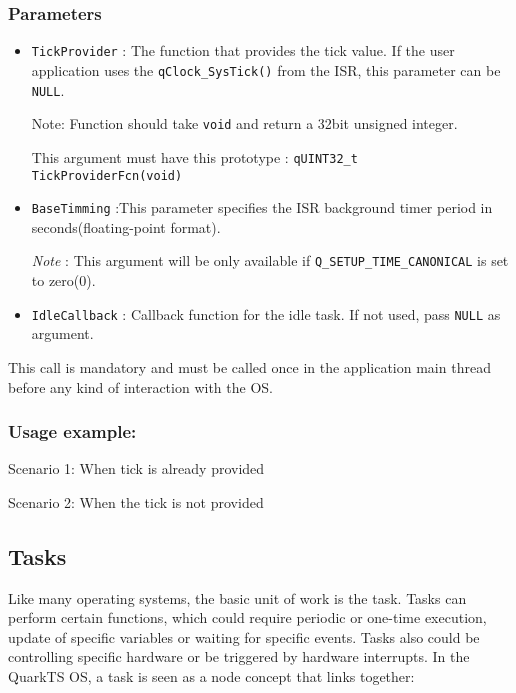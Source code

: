 \subsubsection*{Parameters}
\begin{itemize}
    \item \lstinline{TickProvider} : The function that provides the tick value. If the user application uses the \lstinline{qClock_SysTick()} from the ISR, this parameter can be \lstinline{NULL}. 
    
    Note: Function should take \lstinline{void} and return a 32bit unsigned integer.
    
    This argument must have this prototype : \lstinline{qUINT32_t TickProviderFcn(void)}
    \item \lstinline{BaseTimming} :This parameter specifies the ISR background timer period in seconds(floating-point format).
    
    \textit{Note} : This argument will be only available if \lstinline{Q_SETUP_TIME_CANONICAL} is set to zero(0).
    \item \lstinline{IdleCallback} : Callback function for the idle task. If not used, pass \lstinline{NULL} as argument.
\end{itemize}


\begin{tcolorbox}
\HandRight This call is mandatory and must be called once in the application main thread before any kind of interaction with the OS.
\end{tcolorbox}

\subsubsection*{Usage example:}
Scenario 1: When tick is already provided



Scenario 2: When the tick is not provided


\subsection{Tasks}
Like many operating systems, the basic unit of work is the task. Tasks can perform certain functions, which could require periodic or one-time execution, update of specific variables or waiting for specific events. Tasks also could be controlling specific hardware or be triggered by hardware interrupts. In the QuarkTS OS, a task is seen as a node concept that links together:

